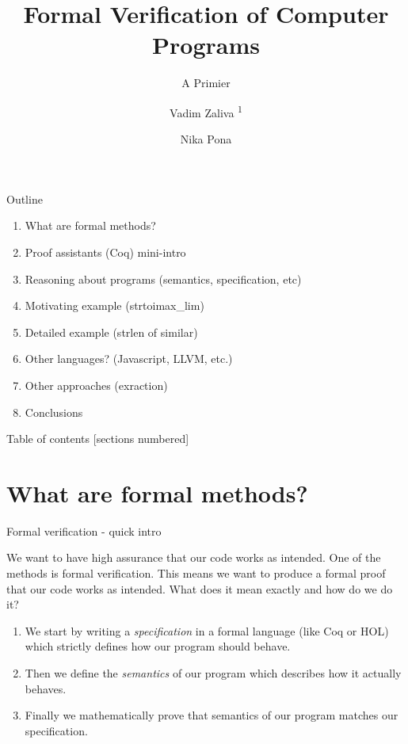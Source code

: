 \documentclass[10pt]{beamer}
\title{Formal Verification of Computer Programs}
\subtitle{A Primier}
\date{\date{}}
\author[shortname]{Vadim Zaliva \textsuperscript{1} \and Nika Pona \inst{2}}
\institute[shortinst]{\textsuperscript{1}Carnegie Mellon  University \and \inst{2} Digamma.ai}
\begin{document}
\maketitle

\begin{frame}{Outline}
    \begin{enumerate}
        \item What are formal methods?
        \item Proof assistants (Coq) mini-intro
        \item Reasoning about programs (semantics, specification, etc)
        \item Motivating example (strtoimax\_lim)
        \item Detailed example (strlen of similar)
        \item Other languages? (Javascript, LLVM, etc.)
        \item Other approaches (exraction)
        \item Conclusions
    \end{enumerate}
\end{frame}

\begin{frame}{Table of contents}
  [sections numbered]
  \tableofcontents[hideallsubsections]
\end{frame}



\section{What are formal methods?}
\begin{frame}{Formal verification - quick intro}
 
  We want to have high assurance that our code works as intended. One of the methods is formal verification. This means we want to produce a formal proof that our code works as intended. What does it mean exactly and how do we do it?
  
  \begin{enumerate}
  \item We start by writing a \emph{specification} in a formal language (like Coq or HOL) which strictly defines how our program should behave.
  \item Then we define the \emph{semantics} of our program which describes how it actually behaves. 
  \item Finally we mathematically prove that semantics of our program matches our specification.
\end{enumerate}
  
\end{frame}
\end{document}
